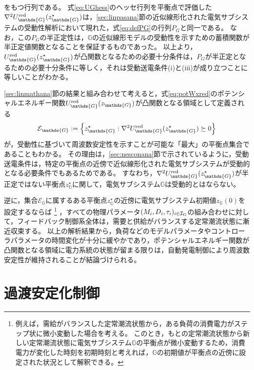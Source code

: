 \documentclass[tombow,dvipdfmx]{corona-a5-1.1}
\begin{document}
をもつ行列である。
式\ref{eq:UGhess}のヘッセ行列を平衡点で評価した$\nabla^2 U_{\mathds{G}}^{\rm red} (z_{\mathds{G}}^{\star})$は，\ref{sec:linpasana}節の近似線形化された電気サブシステムの受動性解析において現れた，式\ref{eq:defPG}の行列$P_G$と同一である。
なお，この$P_G$の半正定性は，$\mathds{G}$の近似線形モデルの受動性を示すための蓄積関数が半正定値関数となることを保証するものであった。
以上より，$U_{\mathds{G}}^{\rm red} (z_{\mathds{G}}^{\star})$が凸関数となるための必要十分条件は，$P_G$が半正定となるための必要十分条件に等しく，それは受動送電条件(i)と(iii)が成り立つことに等しいことがわかる。


\ref{sec:linmathana}節の結果と組み合わせて考えると，式\ref{eq:potWxred}のポテンシャルエネルギー関数$U_{\mathds{G}}^{\rm red} (z_{\mathds{G}})$が凸関数となる領域として定義される
\[
\mathcal{E}_{\mathds{G}}:=
\left\{
z_{\mathds{G}}^{\star} : \nabla^2 U_{\mathds{G}}^{\rm red} (z_{\mathds{G}}^{\star}) 
\succeq 0
\right\}
\]
が，受動性に基づいて周波数安定性を示すことが可能な「最大」の平衡点集合であることもわかる。
その理由は，\ref{sec:nesconana}節で示されているように，受動送電条件は，特定の平衡点の近傍で近似線形化された電気サブシステムが受動的となる必要条件でもあるためである。
すなわち，$\nabla^2 U_{\mathds{G}}^{\rm red} (z_{\mathds{G}}^{\star}) $が半正定ではない平衡点$z_{\mathds{G}}^{\star}$に関して，電気サブシステム$\mathds{G}$は受動的とはならない。

逆に，集合$\mathcal{E}_{\mathds{G}}$に属するある平衡点$z_{\mathds{G}}^{\star}$の近傍に電気サブシステム初期値$z_{\mathds{G}}(0)$を設定するならば
\footnote{
例えば，需給がバランスした定常潮流状態から，ある負荷の消費電力がステップ状に微小変動した場合を考える。
このとき，もとの定常潮流状態から新しい定常潮流状態に電気サブシステム$\mathds{G}$の平衡点が微小変動するため，消費電力が変化した時刻を初期時刻と考えれば，$\mathds{G}$の初期値が平衡点の近傍に設定された状況として解釈できる。
}
，すべての物理パラメータ$(M_i,D_i,\tau_i)_{i \in \mathcal{I}_{\rm G}}$の組み合わせに対して，フィードバック制御系全体は，需要と供給がバランスする定常潮流状態に漸近収束する。
以上の解析結果から，負荷などのモデルパラメータやコントローラパラメータの時間変化が十分に緩やかであり，ポテンシャルエネルギー関数が凸関数となる領域に電力系統の状態が留まる限りは，自動発電制御により周波数安定性が維持されることが結論づけられる。


\section{過渡安定化制御}\label{sec:transcont}
\end{document}
